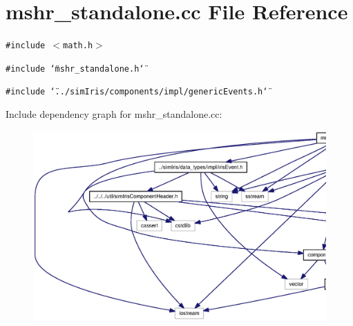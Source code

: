 \section{mshr\_\-standalone.cc File Reference}
\label{mshr__standalone_8cc}
{\tt \#include $<$math.h$>$}\par
{\tt \#include \char`\"{}mshr\_\-standalone.h\char`\"{}}\par
{\tt \#include \char`\"{}../simIris/components/impl/genericEvents.h\char`\"{}}\par


Include dependency graph for mshr\_\-standalone.cc:\nopagebreak
\begin{figure}[H]
\begin{center}
\leavevmode
\includegraphics[width=420pt]{mshr__standalone_8cc__incl}
\end{center}
\end{figure}
